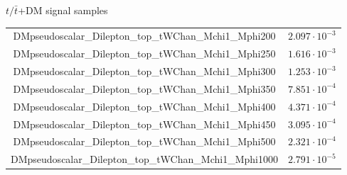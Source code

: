 \documentclass[8pt]{beamer}
\begin{document}
\begin{frame}{$t/\bar t$+DM signal samples}
\begin{table}
\begin{center}
{\begin{tabular}{ c|c }
 DMpseudoscalar\_Dilepton\_top\_tWChan\_Mchi1\_Mphi200 & $2.097 \cdot 10^{-3}$ \\
 DMpseudoscalar\_Dilepton\_top\_tWChan\_Mchi1\_Mphi250 & $1.616 \cdot 10^{-3}$ \\
 DMpseudoscalar\_Dilepton\_top\_tWChan\_Mchi1\_Mphi300 & $1.253 \cdot 10^{-3}$ \\
 DMpseudoscalar\_Dilepton\_top\_tWChan\_Mchi1\_Mphi350 & $7.851 \cdot 10^{-4}$ \\
 DMpseudoscalar\_Dilepton\_top\_tWChan\_Mchi1\_Mphi400 & $4.371 \cdot 10^{-4}$ \\
 DMpseudoscalar\_Dilepton\_top\_tWChan\_Mchi1\_Mphi450 & $3.095 \cdot 10^{-4}$ \\
 DMpseudoscalar\_Dilepton\_top\_tWChan\_Mchi1\_Mphi500 & $2.321 \cdot 10^{-4}$ \\
 DMpseudoscalar\_Dilepton\_top\_tWChan\_Mchi1\_Mphi1000 & $2.791 \cdot 10^{-5}$ \\
 \hline
\end{tabular}
}
\end{center}
\end{table}
\end{frame}
\end{document}
